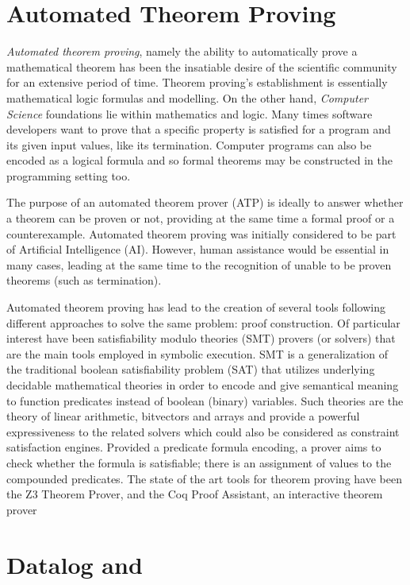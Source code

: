 \section{Automated Theorem Proving}

\textit{Automated theorem proving}, namely the ability to automatically prove a
mathematical theorem has been the insatiable desire of the scientific
community for an extensive period of time. Theorem proving's establishment
is essentially mathematical logic formulas and modelling. On the other hand,
\textit{Computer Science} foundations lie within mathematics and logic.
Many times software developers want to prove that a specific property is satisfied
for a program and its given input values, like its termination. Computer
programs can also be encoded as a logical formula and so formal theorems may be
constructed in the programming setting too.

The purpose of an automated theorem prover (ATP) is ideally to answer whether a
theorem can be proven or not, providing at the same time a formal proof
or a counterexample. Automated theorem proving was initially considered to be
part of Artificial Intelligence (AI). However, human assistance would be essential
in many cases, leading at the same time to the recognition of unable to be proven
theorems (such as termination).

Automated theorem proving has lead to the creation of several tools following
different approaches to solve the same problem: proof construction. Of particular
interest have been satisfiability modulo theories (SMT) provers (or solvers)
that are the main tools employed in symbolic execution. SMT is a generalization
of the traditional boolean satisfiability problem (SAT) that utilizes underlying
decidable mathematical theories in order to encode and give semantical
meaning to function predicates instead of boolean (binary) variables. Such theories
are the theory of linear arithmetic, bitvectors and arrays and provide a powerful
expressiveness to the related solvers which could also be considered as
constraint satisfaction engines. Provided a predicate formula encoding, a prover
aims to check whether the formula is satisfiable; there is an assignment of values
to the compounded predicates. The state of the art tools for theorem proving
have been the Z3 Theorem Prover\cite{de2008z3}, and the Coq Proof
Assistant\cite{Coq}, an interactive theorem prover

\section{Datalog and \doop{}}

